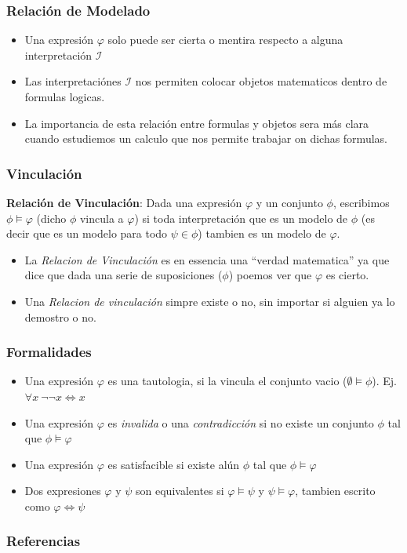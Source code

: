 \documentclass{beamer}
\begin{document}
\begin{frame}
    \frametitle{Relaci\'on de Modelado}
    \begin{itemize}
        \item{Una expresi\'on $\varphi$ solo puede ser cierta o mentira
            respecto a alguna interpretaci\'on $\mathcal{I}$}
        \item{Las interpretaci\'ones $\mathcal{I}$ nos permiten colocar
            objetos matematicos dentro de formulas logicas.}
        \item{La importancia de esta relaci\'on entre formulas y objetos
            sera m\'as clara cuando estudiemos un calculo que nos permite
            trabajar on dichas formulas.}
    \end{itemize}
\end{frame}

\begin{frame}
    \frametitle{Vinculaci\'on}
    {\bf Relaci\'on de Vinculaci\'on}: Dada una expresi\'on $\varphi$ y
    un conjunto $\phi$, escribimos $\phi\models\varphi$ (dicho $\phi$
    vincula a $\varphi$) si toda interpretaci\'on que es un modelo
    de $\phi$ (es decir que es un modelo para todo $\psi\in\phi$)
    tambien es un modelo de $\varphi$.
    \\\vspace{1cm}
    \begin{itemize}
        \item{La \emph{Relacion de Vinculaci\'on} es en essencia una ``verdad matematica''
            ya que dice que dada una serie de suposiciones ($\phi$) poemos ver que
            $\varphi$ es cierto.}
        \item{Una \emph{Relacion de vinculaci\'on} simpre existe o no, sin importar
            si alguien ya lo demostro o no.}
    \end{itemize}
\end{frame}

\begin{frame}
    \frametitle{Formalidades}
    \begin{itemize}
        \item{Una expresi\'on $\varphi$ es una tautologia, si la
        vincula el conjunto vacio ($\emptyset\models\phi$). Ej.
        $\forall x\ \neg\neg x \Leftrightarrow x$}
        \item{Una expresi\'on $\varphi$ es \emph{invalida} o una \emph{contradicci\'on}
            si no existe un conjunto $\phi$ tal que $\phi\models\varphi$}
        \item{Una expresi\'on $\varphi$ es satisfacible si existe al\'un $\phi$
            tal que $\phi\models\varphi$}
        \item{Dos expresiones $\varphi$ y $\psi$ son equivalentes si $\varphi\models\psi$
            y $\psi\models\varphi$, tambien escrito como $\varphi\Leftrightarrow\psi$}
    \end{itemize}
\end{frame}

\begin{frame}
    \frametitle{Referencias}
    
    
\end{frame}
\end{document}

